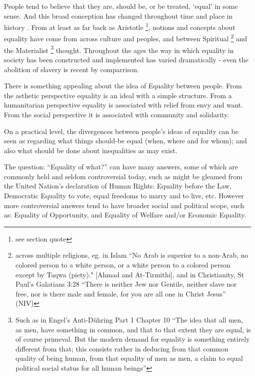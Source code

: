 People tend to believe that they are, should be, or be treated, `equal' in some sense.
And this broad conception has changed throughout time and place in history \cite{themeaningofequalitycapaldi}.
From at least as far back as Aristotle \cite{AristotleGutenberg}\footnote{see section quote}, notions and concepts about equality have come from across culture and peoples, and between Spiritual \footnote{across multiple religions, eg. in Islam ``No Arab is superior to a non-Arab, no colored person to a  white person, or a white person to a colored person except by Taqwa (piety)." [Ahmad and At-Tirmithi], and in Christianity, St Paul's Galatians 3:28 ``There is neither Jew nor Gentile, neither slave nor free, nor is there male and female, for you are all one in Christ Jesus'' (NIV) } and the Materialist \footnote{Such as in Engel's Anti-D\"{u}hring Part 1 Chapter 10 ``The idea that all men, as men, have something in common, and that to that extent they are equal, is of course primeval. But the modern demand for equality is something entirely different from that; this consists rather in deducing from that common quality of being human, from that equality of men as men, a claim to equal political social status for all human beings''} thought.
Throughout the ages the way in which equality in society has been constructed and implemented has varied dramatically - even the abolition of slavery is recent by comparrison.

There is something appealing about the idea of Equality between people.
From the asthetic perspective equality is an ideal with a simple structure. From a humanitarian perspective equality is associated with relief from envy and want. From the social perspective it is associated with community and solidarity.%


On a practical level, the divergences between people's ideas of equality can be seen as regarding what things should-be equal (when, where and for whom); and also what should be done about inequalities as may exist.

The question: ``Equality of what?'' can have many answers, some of which are commonly held and seldom controversial today, such as might be gleamed from the United Nation's declaration of Human Rights: Equality before the Law, Democratic Equality to vote, equal freedoms to marry and to live, etc.\cite{udhr}
However more controversial answers tend to have broader social and political scope, such as: Equality of Opportunity, and Equality of Welfare and/or Economic Equality.%

